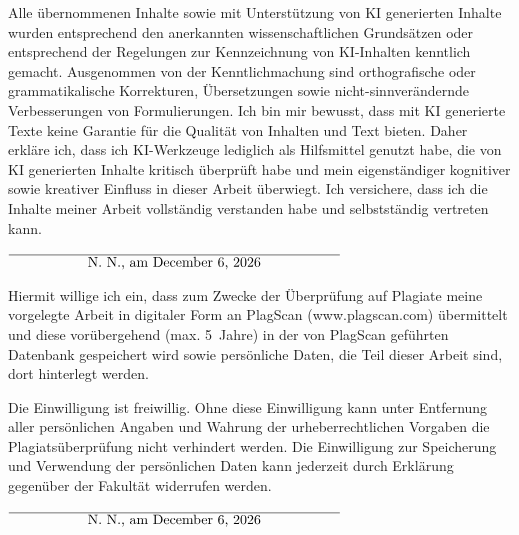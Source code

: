 \documentclass[12pt,twoside=false,a4paper,parskip]{scrbook}
\def\BaAuthor{Martin Rapps}
\def\ShowBaAuthor{\BaAuthor}
\def\ShowBaAuthor{N.~N.}
\begin{document}
Alle übernommenen Inhalte sowie mit Unterstützung von KI generierten Inhalte wurden entsprechend den anerkannten wissenschaftlichen Grundsätzen oder entsprechend der Regelungen zur Kennzeichnung von KI-Inhalten kenntlich gemacht. Ausgenommen von der Kenntlichmachung sind orthografische oder grammatikalische Korrekturen, Übersetzungen sowie nicht-sinnverändernde Verbesserungen von Formulierungen. Ich bin mir bewusst, dass mit KI generierte Texte keine Garantie für die Qualität von Inhalten und Text bieten. Daher erkläre ich, dass ich KI-Werkzeuge lediglich als Hilfsmittel genutzt habe, die von KI generierten Inhalte kritisch überprüft habe und mein eigenständiger kognitiver sowie kreativer Einfluss in dieser Arbeit überwiegt. Ich versichere, dass ich die Inhalte meiner Arbeit vollständig verstanden habe und selbstständig vertreten kann.

\vspace{20pt}
\begin{flushright}
  $\overline{~~~~~~~~~~~~~~~~~\mbox{\ShowBaAuthor, am \today}~~~~~~~~~~~~~~~~~}$
\end{flushright}


Hiermit willige ich ein, dass zum Zwecke der Überprüfung auf Plagiate meine vorgelegte Arbeit in digitaler Form an PlagScan (www.plagscan.com) übermittelt und diese vorübergehend (max. 5~Jahre) in der von PlagScan geführten Datenbank gespeichert wird sowie persönliche Daten, die Teil dieser Arbeit sind, dort hinterlegt werden.

\begin{small}
  Die Einwilligung ist freiwillig. Ohne diese Einwilligung kann unter Entfernung aller persönlichen Angaben und Wahrung der urheberrechtlichen Vorgaben die Plagiatsüberprüfung nicht verhindert werden. Die Einwilligung zur Speicherung und Verwendung der persönlichen Daten kann jederzeit durch Erklärung gegenüber der Fakultät widerrufen werden.
\end{small}

\vspace{20pt}
\begin{flushright}
  $\overline{~~~~~~~~~~~~~~~~~\mbox{\ShowBaAuthor, am \today}~~~~~~~~~~~~~~~~~}$
\end{flushright}
\end{document}
